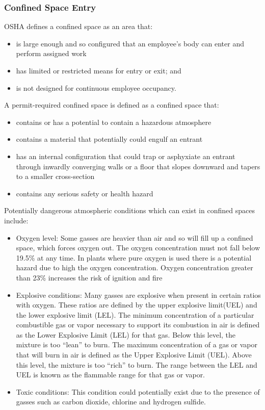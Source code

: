 \documentclass{article}
\begin{document}
\subsubsection{Confined Space Entry}
OSHA defines a confined space as an area that:
\begin{itemize} 
\item is large enough and so configured that an employee's body can enter and perform assigned work
\item has limited or restricted means for entry or exit; and
\item is not designed for continuous employee occupancy.
\end{itemize}
A permit-required confined space is defined as a confined space that:
\begin{itemize} 
\item contains or has a potential to contain a hazardous atmosphere
\item contains a material that potentially could engulf an entrant
\item has an internal configuration that could trap or asphyxiate an entrant through inwardly converging walls or a floor that slopes downward and tapers to a smaller cross-section
\item contains any serious safety or health hazard
\end{itemize}

Potentially dangerous atmospheric conditions which can exist in confined spaces include: 
\begin{itemize}
\item Oxygen level: Some gasses are heavier than air and so will fill up a confined space, which forces oxygen out.  The oxygen concentration must not fall below 19.5\% at any time.  In plants where pure oxygen is used there is a potential hazard due to high the oxygen concentration.  Oxygen concentration greater than 23\% increases the risk of ignition and fire
\item Explosive conditions:  Many gasses are explosive when present in certain ratios with oxygen. These ratios are defined by the upper explosive limit(UEL) and the lower explosive limit (LEL).  The minimum concentration of a particular combustible gas or vapor necessary to support its combustion in air is defined as the Lower Explosive Limit (LEL) for that gas. Below this level, the mixture is too “lean” to burn. The maximum concentration of a gas
or vapor that will burn in air is defined as the Upper Explosive Limit (UEL). Above this level, the mixture is too “rich” to burn.  The range between the LEL and UEL is known as the flammable range for that gas or vapor.  
\item Toxic conditions:  This condition could potentially exist due to the presence of gasses such as carbon dioxide, chlorine and hydrogen sulfide.  
\end{itemize}
\end{document}
